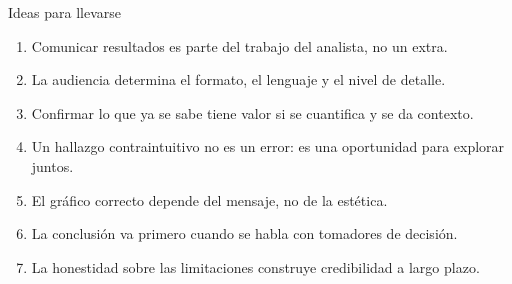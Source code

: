 \documentclass[aspectratio=169]{beamer}
\begin{document}
\begin{frame}{Ideas para llevarse}
  \begin{enumerate}
    \item Comunicar resultados es parte del trabajo del analista, no un extra.
    \item La audiencia determina el formato, el lenguaje y el nivel de detalle.
    \item Confirmar lo que ya se sabe tiene valor si se cuantifica y se da contexto.
    \item Un hallazgo contraintuitivo no es un error: es una oportunidad para explorar juntos.
    \item El gráfico correcto depende del mensaje, no de la estética.
    \item La conclusión va primero cuando se habla con tomadores de decisión.
    \item La honestidad sobre las limitaciones construye credibilidad a largo plazo.
  \end{enumerate}
\end{frame}
\end{document}
